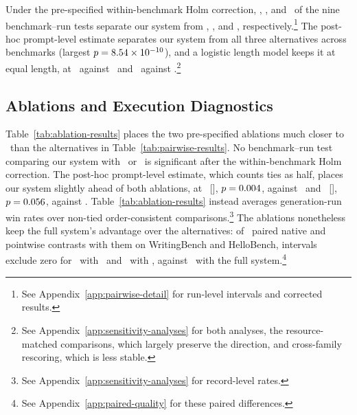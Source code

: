 Under the pre-specified within-benchmark Holm correction, \PooledFourOneHolmCellsTotal, \PooledFourTwoHolmCellsTotal, and \PooledFourThreeHolmCellsTotal\ of the nine benchmark--run tests separate our system from \condSinglePass, \condStaged, and \condTaskPlanning, respectively.\footnote{See Appendix~\ref{app:pairwise-detail} for run-level intervals and corrected results.}
The post-hoc prompt-level estimate separates our system from all three alternatives across benchmarks (largest $p=8.54\times 10^{-10}$), and a logistic length model keeps it at equal length, at \LengthModelFullStagedPreference\ against \condStaged\ and \LengthModelFullTaskPlanningPreference\ against \condTaskPlanning.\footnote{See Appendix~\ref{app:sensitivity-analyses} for both analyses, the resource-matched comparisons, which largely preserve the direction, and cross-family rescoring, which is less stable.}



\subsection{Ablations and Execution Diagnostics}
\label{sec:results-mechanism}

Table~\ref{tab:ablation-results} places the two pre-specified ablations much closer to \condAgenticCogWriter\ than the alternatives in Table~\ref{tab:pairwise-results}.
No benchmark--run test comparing our system with \condNoGoals\ or \condFixedOrder\ is significant after the within-benchmark Holm correction.
The post-hoc prompt-level estimate, which counts ties as half, places our system slightly ahead of both ablations, at \ClusteredFullFixedOrderRate\ [\ClusteredFullFixedOrderInterval], $p=0.004$, against \condFixedOrder\ and \ClusteredFullNoGoalsRate\ [\ClusteredFullNoGoalsInterval], $p=0.056$, against \condNoGoals.
Table~\ref{tab:ablation-results} instead averages generation-run win rates over non-tied order-consistent comparisons.\footnote{See Appendix~\ref{app:sensitivity-analyses} for record-level rates.}
The ablations nonetheless keep the full system's advantage over the alternatives: of \PairedSeparationMeasureCount\ paired native and pointwise contrasts with them on WritingBench and HelloBench, intervals exclude zero for \PairedSeparatedNoGoals\ with \condNoGoals\ and \PairedSeparatedFixedOrder\ with \condFixedOrder, against \PairedSeparatedFull\ with the full system.\footnote{See Appendix~\ref{app:paired-quality} for these paired differences.}

